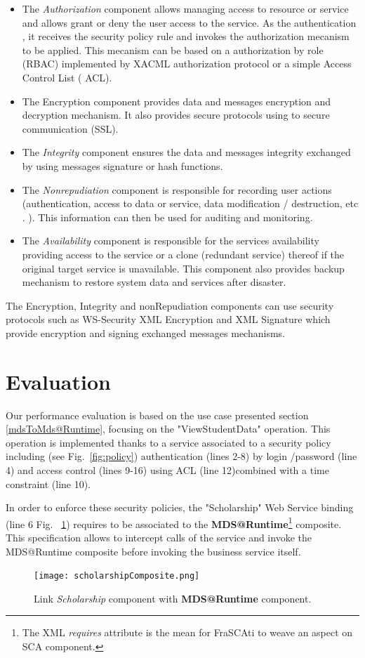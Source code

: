 \documentclass[runningheads,a4paper]{llncs}
\begin{document}
\begin{itemize}
\item The \emph{Authorization} component allows managing access to resource or service and allows grant or deny the user access to the service. As the authentication , it receives the security policy rule and invokes the authorization mecanism to be applied. This mecanism can be  based on a authorization by role (RBAC) implemented by XACML authorization protocol or a simple Access Control List ( ACL).
\item The Encryption component provides data and messages encryption and decryption mechanism. It also provides secure protocols using  to secure communication (SSL).
\item The \emph{Integrity} component ensures the data and messages integrity exchanged by using messages signature or hash functions.
\item The \emph{Nonrepudiation} component is responsible for recording user actions (authentication, access to data or service, data modification / destruction, etc . ). This information can then be used for auditing and monitoring.
\item The \emph{Availability} component is responsible for the services availability providing access to the service or a clone (redundant service) thereof if the original target service is unavailable. This component also provides backup mechanism to restore system data and services after disaster.


\end{itemize}

The Encryption, Integrity and nonRepudiation components can use security protocols such as WS-Security XML Encryption and XML Signature which provide encryption and signing  exchanged messages mechanisms.


\section{Evaluation}

\label{sec:exemple}

Our performance evaluation is based on the use case presented section \ref{mdsToMds@Runtime}, focusing on the "ViewStudentData" operation. This operation is implemented thanks to a service associated to a security policy including  (see Fig.~\ref{fig:policy}) authentication (lines 2-8) by login /password (line 4) and access control (lines 9-16) using ACL (line 12)combined with a time constraint (line 10).

 In order to enforce these security policies, the "Scholarship"  Web Service binding (line 6 Fig. ~\ref{fig:gestionEtudiant}) requires to be associated to the \textbf{MDS@Runtime}\footnote{The XML \emph{requires} attribute is the mean for FraSCAti to weave an aspect on SCA component.} composite. This specification allows to intercept calls of the service and invoke the  MDS@Runtime composite before invoking the business service itself.
\begin{figure}  
\center
\texttt{[image: scholarshipComposite.png]}
\caption{Link \emph{Scholarship} component with \textbf{MDS@Runtime} component.}
\label{fig:gestionEtudiant}
\end{figure}
\end{document}
